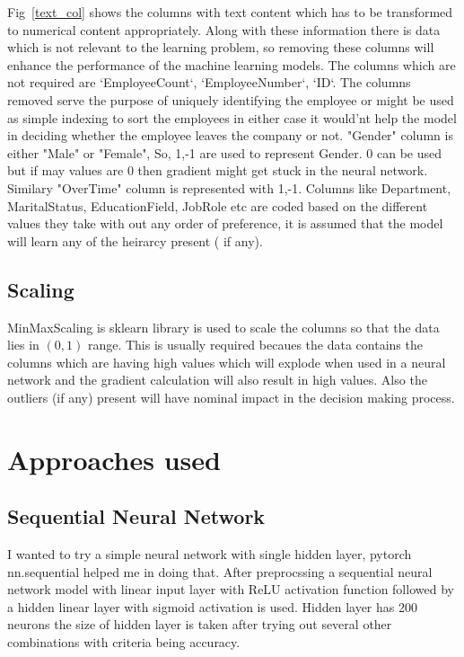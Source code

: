 \documentclass{article}
\begin{document}
Fig~\ref{text_col} shows the columns with text content which has to be transformed to numerical content appropriately. Along with these information there is data which is not relevant to the learning problem, so removing these columns will enhance the performance of the machine learning models. The columns which are not required are `EmployeeCount`, `EmployeeNumber`, `ID`. The columns removed serve the purpose of uniquely identifying the employee or might be used as simple indexing to sort the employees in either case it would'nt help the model in deciding whether the employee leaves the company or not.
"Gender" column is either "Male"  or "Female", So, 1,-1 are used to represent Gender. 0 can be used but if may values are 0 then gradient might get stuck in the neural network. Similary "OverTime" column is represented with 1,-1. Columns like Department, MaritalStatus, EducationField, JobRole etc are coded based on the different values they take with out any order of preference, it is assumed that the model will learn any of the heirarcy present ( if any).

\subsection{Scaling}
MinMaxScaling is sklearn library is used to scale the columns so that the data lies in $(0,1)$ range. This is usually required becaues the data contains the columns which are having high values which will explode when used in a neural network and the gradient calculation will also result in high values. Also the outliers (if any) present will have nominal impact in the decision making process.
\section{Approaches used}
\label{sec:pagestyle}
\subsection{Sequential Neural Network}
I wanted to try a simple neural network with single hidden layer, pytorch nn.sequential helped me in doing that. After preprocssing a sequential neural network model with linear input layer with ReLU activation function followed by a hidden linear layer with sigmoid activation is used. Hidden layer has 200 neurons the size of hidden layer is taken after trying out several other combinations with criteria being accuracy.
\end{document}
